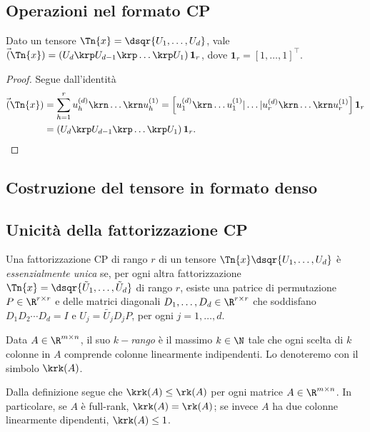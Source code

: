 \subsection{Operazioni nel formato CP}
  
\begin{lemma}
  Dato un tensore $ \Tn{x} = \dsqr{U_1,\ldots,U_d} $, vale $ \vec(\Tn{x}) = \left( U_d \krp U_{d-1}
    \krp \ldots \krp U_1 \right) \mathbf{1}_r$, dove $ \mathbf{1}_r = \left[ 1, \ldots, 1
    \right]^{\top} $.
\end{lemma}
\begin{proof}
  Segue dall'identità
  \begin{equation*}
    \begin{aligned}
      \vec({\Tn{x}}) &= \sum_{h=1}^r u_h^{(d)} \krn \ldots \krn u_h^{(1)} = \left[ u_1^{(d)} 
  \krn \ldots u_1^{(1)} | \ldots | u_r^{(d)} \krn \ldots \krn u_r^{(1)}\right]\mathbf{1}_r \\
                     &= \left( U_d \krp U_{d-1} \krp \ldots \krp U_1 \right) \mathbf{1}_r.
    \end{aligned}
  \end{equation*}
\end{proof}

\subsection{Costruzione del tensore in formato denso}

\subsection{Unicità della fattorizzazione CP}

\begin{definition}
  Una fattorizzazione CP di rango $ r $ di un tensore $ \Tn{x} \dsqr{U_1, \ldots, U_d}$ è
  \emph{essenzialmente unica} se, per ogni altra fattorizzazione $ \Tn{x} = \dsqr{\tilde{U}_1,
  \ldots, \tilde{U}_d}$ di rango $ r $, esiste una patrice di permutazione $ P \in \R^{r \times r} $
  e delle matrici diagonali $ D_1, \ldots, D_d \in \R^{r \times r} $ che soddisfano $ D_1 D_2 \cdots D_d =
  I$ e $U_j = \tilde{U_j}D_jP$, per ogni $ j = 1, \ldots, d $.
\end{definition}

\begin{definition}[$ k- $rango]
  Data $ A \in \R^{m\times n} $, il suo \emph{$ k- $rango} è il massimo $ k \in \N $ tale che ogni
  scelta di $ k $ colonne in $ A $ comprende colonne linearmente indipendenti. Lo denoteremo con il
  simbolo $ \krk(A) $.
\end{definition}
\begin{remark}
  Dalla definizione segue che $ \krk(A) \le \rk(A) $ per ogni matrice $ A \in \R^{m \times n} $. In
  particolare, se $ A $ è full-rank, $ \krk(A) = \rk(A) $; se invece $ A $ ha due colonne linearmente
  dipendenti, $ \krk(A) \le 1 $.
\end{remark}

